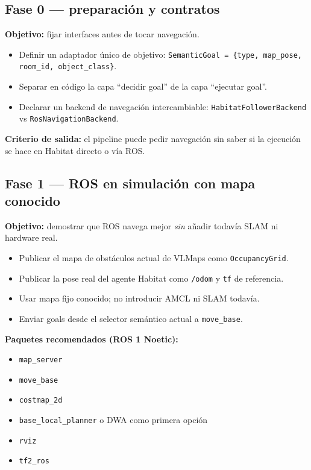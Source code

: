 \documentclass[11pt,a4paper]{article}
\begin{document}
\subsection{Fase 0 --- preparación y contratos}

\textbf{Objetivo:} fijar interfaces antes de tocar navegación.

\begin{itemize}
  \item Definir un adaptador único de objetivo:
        \texttt{SemanticGoal = \{type, map\_pose, room\_id, object\_class\}}.
  \item Separar en código la capa ``decidir goal'' de la capa ``ejecutar goal''.
  \item Declarar un backend de navegación intercambiable:
        \texttt{HabitatFollowerBackend} vs \texttt{RosNavigationBackend}.
\end{itemize}

\textbf{Criterio de salida:} el pipeline puede pedir navegación sin saber si la
ejecución se hace en Habitat directo o vía ROS.

\subsection{Fase 1 --- ROS en simulación con mapa conocido}

\textbf{Objetivo:} demostrar que ROS navega mejor \emph{sin} añadir todavía
SLAM ni hardware real.

\begin{itemize}
  \item Publicar el mapa de obstáculos actual de VLMaps como
        \texttt{OccupancyGrid}.
  \item Publicar la pose real del agente Habitat como \texttt{/odom} y
        \texttt{tf} de referencia.
  \item Usar mapa fijo conocido; no introducir AMCL ni SLAM todavía.
  \item Enviar goals desde el selector semántico actual a \texttt{move\_base}.
\end{itemize}

\textbf{Paquetes recomendados (ROS 1 Noetic):}
\begin{itemize}
  \item \texttt{map\_server}
  \item \texttt{move\_base}
  \item \texttt{costmap\_2d}
  \item \texttt{base\_local\_planner} o DWA como primera opción
  \item \texttt{rviz}
  \item \texttt{tf2\_ros}
\end{itemize}
\end{document}
